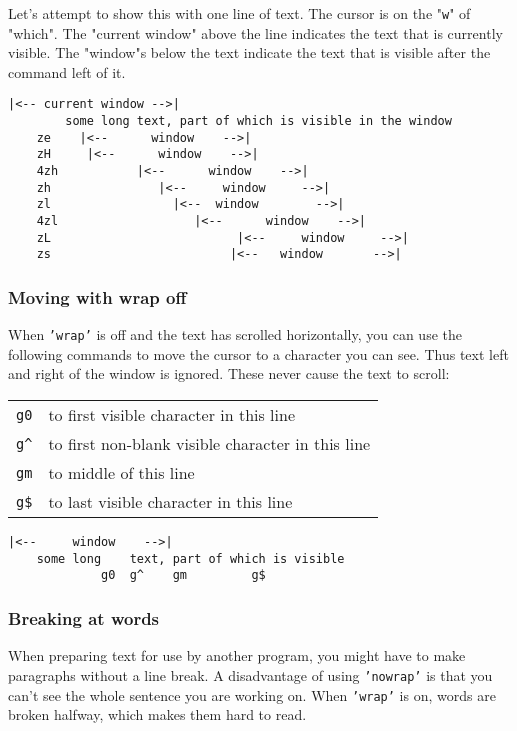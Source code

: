 Let's attempt to show this with one line of text.
The cursor is on the "\texttt{w}" of "which".
The "current window" above the line indicates the text that is currently visible.
The "window"s below the text indicate the text that is visible after the command left of it.

\begin{Verbatim}[samepage=true]
                      |<-- current window -->|
        some long text, part of which is visible in the window 
    ze    |<--      window    -->|
    zH     |<--      window    -->|
    4zh           |<--      window    -->|
    zh               |<--     window     -->|
    zl                 |<--  window        -->|
    4zl                   |<--      window    -->|
    zL                          |<--     window     -->|
    zs                         |<--   window       -->|
\end{Verbatim}

\subsubsection{Moving with wrap off}
When \texttt{'wrap'} is off and the text has scrolled horizontally, you can use the following commands to move the cursor to a character you can see.
Thus text left and right of the window is ignored.
These never cause the text to scroll:

\begin{center} \begin{tabular}{c l}
				\texttt{g0} & to first visible character in this line \\
				\texttt{g\^{}} & to first non-blank visible character in this line \\
				\texttt{gm} & to middle of this line \\
				\texttt{g\$} & to last visible character in this line \\
\end{tabular} \end{center}

\begin{Verbatim}[samepage=true]
            |<--     window    -->|
    some long    text, part of which is visible 
             g0  g^    gm         g$
\end{Verbatim}

\subsubsection{Breaking at words}
\label{edit-no-break}
When preparing text for use by another program, you might have to make paragraphs without a line break.
A disadvantage of using \texttt{'nowrap'} is that you can't see the whole sentence you are working on.
When \texttt{'wrap'} is on, words are broken halfway, which makes them hard to read.

